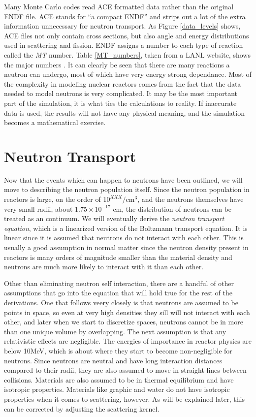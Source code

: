 Many Monte Carlo codes read ACE formatted data rather than the original ENDF file.  ACE stands for ``a compact ENDF'' and strips out a lot of the extra information unnecessary for neutron transport.  As Figure \ref{data_levels} shows, ACE files not only contain cross sections, but also angle and energy distributions used in scattering and fission.  ENDF assigns a number to each type of reaction called the \emph{MT} number.  Table \ref{MT_numbers}, taken from a LANL website, shows the major numbers \cite{MTnums}.  It can clearly be seen that there are many reactions a neutron can undergo, most of which have very energy strong dependance.  Most of the complexity in modeling nuclear reactors comes from the fact that the data needed to model neutrons is very complicated.  It may be the most important part of the simulation, it is what ties the calculations to reality.  If inaccurate data is used, the results will not have any physical meaning, and the simulation becomes a mathematical exercise. 

\section{Neutron Transport}

Now that the events which can happen to neutrons have been outlined, we will move to describing the neutron population itself.  Since the neutron population in reactors is large, on the order of $10^{XXX}/\mathrm{cm}^3$, and the neutrons themselves have very small radii, about $1.75\times10^{-17}$ cm, the distribution of neutrons can be treated as an continuum.  We will eventually derive the \emph{neutron transport equation}, which is a linearized version of the Boltzmann transport equation.  It is linear since it is assumed that neutrons do not interact with each other.  This is usually a good assumption in normal matter since the neutron density present in reactors is many orders of magnitude smaller than the material density and neutrons are much more likely to interact with it than each other.  

Other than eliminating neutron self interaction, there are a handful of other assumptions that go into the equation that will hold true for the rest of the derivations.  One that follows veery closely is that neutrons are assumed to be points in space, so even at very high densities they sill will not interact with each other, and later when we start to discretize spaces, neutrons cannot be in more than one unique volume by overlapping.  The next assumption is that any relativistic effects are negligible.  The energies of importance in reactor physics are below 10MeV, which is about where they start to become non-negligible for neutrons.  Since neutrons are neutral and have long interaction distances compared to their radii, they are also assumed to move in straight lines between collisions.  Materials are also assumed to be in thermal equilibrium and have isotropic properties.  Materials like graphic and water do not have isotropic properties when it comes to scattering, however.  As will be explained later, this can be corrected by adjusting the scattering kernel.

